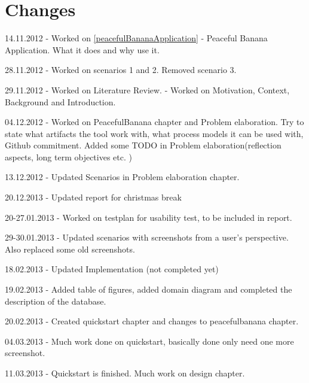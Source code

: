 \chapter*{Changes}
\begin{description}
\item 14.11.2012 - Worked on \autoref{peacefulBananaApplication} - Peaceful Banana Application. What it does and why use it.
\item 28.11.2012 - Worked on scenarios 1 and 2. Removed scenario 3. 
\item 29.11.2012 - Worked on Literature Review. - Worked on Motivation, Context, Background and Introduction. 
\item 04.12.2012 - Worked on PeacefulBanana chapter and Problem elaboration. Try to state what artifacts the tool work with, what process models it can be used with, Github commitment. Added some TODO in Problem elaboration(reflection aspects, long term objectives etc. )
\item 13.12.2012 - Updated Scenarios in Problem elaboration chapter. 
\item 20.12.2013 - Updated report for christmas break
\item 20-27.01.2013 - Worked on testplan for usability test, to be included in report. 
\item 29-30.01.2013 - Updated scenarios with screenshots from a user's perspective. Also replaced some old screenshots. 
\item 18.02.2013 - Updated Implementation (not completed yet)
\item 19.02.2013 - Added table of figures, added domain diagram and completed the description of the database.
\item 20.02.2013 - Created quickstart chapter and changes to peacefulbanana chapter.
\item 04.03.2013 - Much work done on quickstart, basically done only need one more screenshot. 
\item 11.03.2013 - Quickstart is finished. Much work on design chapter. 
\end{description}